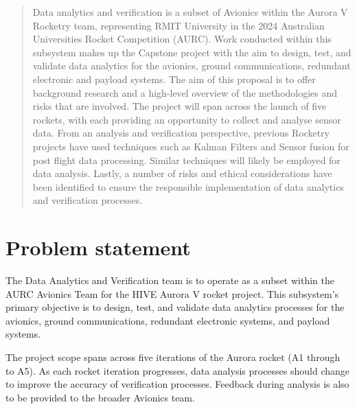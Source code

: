 \begin{abstract}
Data analytics and verification is a subset of Avionics within the Aurora V Rocketry team, representing RMIT University in the 2024 Australian Universities Rocket Competition (AURC). Work conducted within this subsystem makes up the Capstone project with the aim to design, test, and validate data analytics for the avionics, ground communications, redundant electronic and payload systems. The aim of this proposal is to offer background research and a high-level overview of the methodologies and risks that are involved. The project will span across the launch of five rockets, with each providing an opportunity to collect and analyse sensor data. From an analysis and verification perspective, previous Rocketry projects have used techniques such as Kalman Filters and Sensor fusion for post flight data processing. Similar techniques will likely be employed for data analysis. Lastly, a number of risks and ethical considerations have been identified to ensure the responsible implementation of data analytics and verification processes.  
\end{abstract}

\section{Problem statement}
The Data Analytics and Verification team is to operate as a subset within the AURC Avionics Team for the HIVE Aurora V rocket project. This subsystem's primary objective is to design, test, and validate data analytics processes for the avionics, ground communications, redundant electronic systems, and payload systems.  

The project scope spans across five iterations of the Aurora rocket (A1 through to A5). As each rocket iteration progresses, data analysis processes should change to improve the accuracy of verification processes. Feedback during analysis is also to be provided to the broader Avionics team.     

